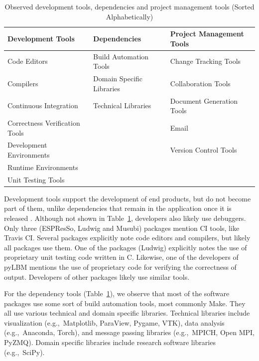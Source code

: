 \documentclass[final, 3p, times, authoryear]{elsarticle}
\begin{document}
\begin{table}[ht!]
	\begin{center}
	\begin{tabular}{ p{5.3 cm} p{4.9 cm} p{5 cm}}
	\toprule
	\textbf{Development Tools} & \textbf{Dependencies} & \textbf{Project
	Management Tools} \\
	\midrule
	Code Editors & Build Automation Tools & Change Tracking Tools\\
	Compilers & Domain Specific Libraries & Collaboration Tools\\
	Continuous Integration & Technical Libraries & Document Generation Tools\\
	Correctness Verification Tools &  & Email\\
	Development Environments &  & Version Control Tools\\
	Runtime Environments &  & \\
	Unit Testing Tools &  & \\
	\bottomrule
	\end{tabular}
	\caption{Observed development tools, dependencies and project management
	tools (Sorted Alphabetically)} \label{tbl_tools}
	\end{center}
\end{table}

Development tools support the development of end products, but do not become
part of them, unlike dependencies that remain in the application once it is
released \citep[p.\ 506]{GhezziEtAl2003}. Although not shown in
Table~\ref{tbl_tools}, developers also likely use debuggers.  Only three
(ESPResSo, Ludwig and Musubi) packages mention CI tools, like Travis CI. Several
packages explicitly note code editors and compilers, but likely all packages use
them. One of the packages (Ludwig) explicitly notes the use of proprietary unit
testing code written in C. Likewise, one of the developers of pyLBM mentions the
use of proprietary code for verifying the correctness of output. Developers of
other packages likely use similar tools.

For the dependency tools (Table~\ref{tbl_tools}), we observe that most of the
software packages use some sort of build automation tools, most commonly Make.
They all use various technical and domain specific libraries. Technical
libraries include visualization (e.g.,\ Matplotlib, ParaView, Pygame, VTK), data
analysis (e.g.,\ Anaconda, Torch), and message passing libraries (e.g.,\ MPICH,
Open MPI, PyZMQ). Domain specific libraries include research software libraries
(e.g.,\ SciPy).
\end{document}
